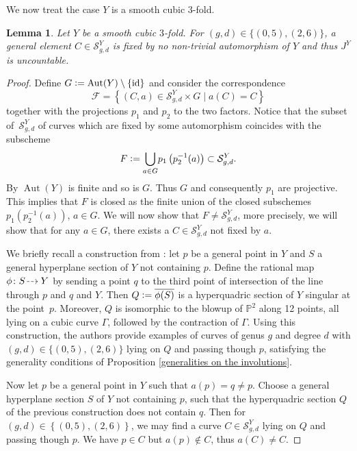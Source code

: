 \documentclass[JEP,XML,SOM,Unicode,published]{cedram}
\newcommand{\dradpl}{{\hspace*{-2.5mm}\begin{tikzcd}[ampersand replacement=\&,column sep = scriptsize]\mbox{}\ar[r,dashed]\&\mbox{}\end{tikzcd}\hspace*{-2.5mm}}}
\newcommand{\dratst}{{\hspace*{-2.5mm}\begin{tikzcd}[ampersand replacement=\&,column sep = small]\mbox{}\ar[r,dashed]\&\mbox{}\end{tikzcd}\hspace*{-2mm}}}
\let\drascst\dratst
\newcommand{\dra}{\mathchoice{\dradpl}{\dratst}{\drascst}{\drascst}}
\let\rmap\dra
\theoremstyle{plain}
\newtheorem{lemma}[theorem]{Lemma}
\theoremstyle{definition}
\newcommand\Aut{\operatorname{Aut}}
\newcommand\id{\operatorname{id}}
\newcommand{\PP}{\mathbb{P}}
\newcommand{\defeq}{\vcentcolon=}
\begin{document}
We now treat the case $Y$ is a smooth cubic $3$-fold.

\begin{lemma}\label{no autos on cubic}
Let $Y$ be a smooth cubic $3$-fold.
For $(g,d) \in \{(0,5),(2,6)\}$, a general element $C \in \mathcal{S}_{g,d}^Y$ is fixed by no non-trivial automorphism of $Y$ and thus $J^Y$ is uncountable.
\end{lemma}

\begin{proof}
Define $G \defeq \Aut(Y)\setminus \{\id\}$ and consider the correspondence\vspace*{-3pt}\enlargethispage{.5\baselineskip}
\[
\mathcal{F} = \left\{(C,a) \in \mathcal{S}_{g,d}^Y \times G \mid a(C)=C \right\}
\]
together with the projections $p_1$ and $p_2$ to the two factors.
Notice that the subset of~$\mathcal{S}_{g,d}^Y$ of curves which are fixed by some automorphism coincides with the subscheme
\[
F \defeq \underset{a\in G}{\bigcup} p_1\left( p_2^{-1}(a)\right) \subset \mathcal{S}_{g,d}^Y.
\]
By \cite{AutosOfHypersurfaces} $\Aut(Y)$ is finite and so is $G$. Thus $G$ and consequently $p_1$ are projective. This implies that $F$ is closed as the finite union of the closed subschemes $p_1\left(p_2^{-1}(a)\right)$, $a \in G$.
We will now show that $F \neq \mathcal{S}_{g,d}^Y$, more precisely, we will show that for any $a \in G$, there exists a $C \in \mathcal{S}_{g,d}^Y$ not fixed by $a$.

We briefly recall a construction from \cite[\S 3.3]{WeakFanosCubics}:
let $p$ be a general point in $Y$ and $S$ a general hyperplane section of $Y$ not containing $p$.
Define the rational map $\phi \colon S \rmap Y$ by sending a point $q$ to the third point of intersection of the line through $p$ and $q$ and $Y$.
Then $Q \defeq\overline{\phi(S)}$ is a hyperquadric section of $Y$ singular at the point~$p$.
Moreover, $Q$ is isomorphic to the blowup of $\PP^2$ along 12 points, all lying on a cubic curve $\Gamma$, followed by the contraction of $\Gamma$.
Using this construction, the authors provide examples of curves of genus $g$ and degree $d$ with $(g,d) \in \{(0,5),(2,6)\}$ lying on $Q$ and passing though $p$, satisfying the generality conditions of Proposition \ref{generalities on the involutions}.

Now let $p$ be a general point in $Y$ such that $a(p) = q \neq p$. Choose a general hyperplane section $S$ of $Y$ not containing $p$, such that the hyperquadric section $Q$ of the previous construction does not contain $q$. Then for $(g,d) \in \left\{ (0,5),(2,6) \right\}$, we may find a curve $C \in \mathcal{S}_{g,d}^Y$ lying on $Q$ and passing though $p$. We have $p \in C$ but $a(p) \notin C$, thus $a(C) \neq C$.
\end{proof}
\end{document}
